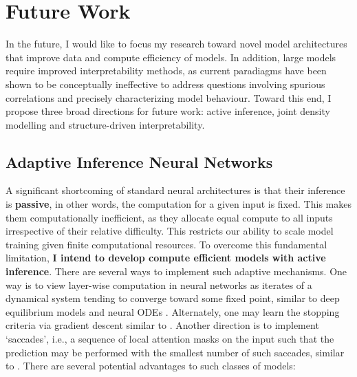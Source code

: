 \documentclass{article}
\renewcommand{\cite}{\citep}
\begin{document}
\section*{Future Work}\label{sec2}
In the future, I would like to focus my research toward novel model architectures that improve data and compute efficiency of models. In addition, large models require improved interpretability methods, as current paradiagms have been shown to be conceptually ineffective \cite{lipton2018mythos} to address questions involving spurious correlations and precisely characterizing model behaviour. Toward this end, I propose three broad directions for future work: active inference, joint density modelling and structure-driven interpretability.

\subsection*{Adaptive Inference Neural Networks} A significant shortcoming of standard neural architectures is that their inference is \textbf{passive}, in other words, the computation for a given input is fixed. This makes them computationally inefficient, as they allocate equal compute to all inputs irrespective of their relative difficulty. This restricts our ability to scale model training given finite computational resources. To overcome this fundamental limitation, \textbf{I intend to develop compute efficient models with active inference}. There are several ways to implement such adaptive mechanisms. One way is to view layer-wise computation in neural networks as iterates of a dynamical system tending to converge toward some fixed point, similar to deep equilibrium models \cite{bai2019deep} and neural ODEs \cite{chen2018neural}. Alternately, one may learn the stopping criteria via gradient descent similar to \citet{graves2016adaptive}. Another direction is to implement `saccades', i.e., a sequence of local attention masks on the input such that the prediction may be performed with the smallest number of such saccades, similar to \citet{mnih2014recurrent}. There are several potential advantages to such classes of models:
\end{document}
